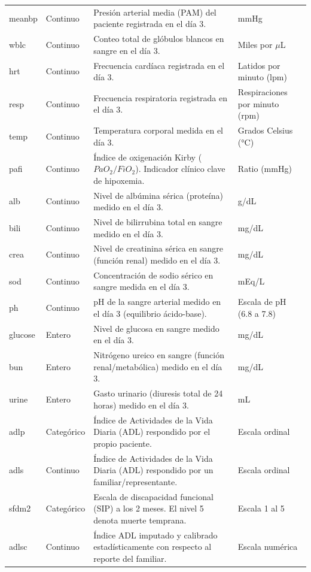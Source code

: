 \begin{longtable}{>{\raggedright\arraybackslash}p{2.1cm}>{\raggedright\arraybackslash}p{1.8cm}>{\raggedright\arraybackslash}p{7.0cm}>{\raggedright\arraybackslash}p{3.2cm}}
meanbp & Continuo & Presión arterial media (PAM) del paciente registrada en el día 3. & mmHg \\
wblc & Continuo & Conteo total de glóbulos blancos en sangre en el día 3. & Miles por $\mu$L \\
hrt & Continuo & Frecuencia cardíaca registrada en el día 3. & Latidos por minuto (lpm) \\
resp & Continuo & Frecuencia respiratoria registrada en el día 3. & Respiraciones por minuto (rpm) \\
temp & Continuo & Temperatura corporal medida en el día 3. & Grados Celsius (°C) \\
pafi & Continuo & Índice de oxigenación Kirby ($PaO_2/FiO_2$). Indicador clínico clave de hipoxemia. & Ratio (mmHg) \\
alb & Continuo & Nivel de albúmina sérica (proteína) medido en el día 3. & g/dL \\
bili & Continuo & Nivel de bilirrubina total en sangre medido en el día 3. & mg/dL \\
crea & Continuo & Nivel de creatinina sérica en sangre (función renal) medido en el día 3. & mg/dL \\
sod & Continuo & Concentración de sodio sérico en sangre medida en el día 3. & mEq/L \\
ph & Continuo & pH de la sangre arterial medido en el día 3 (equilibrio ácido-base). & Escala de pH (6.8 a 7.8) \\
glucose & Entero & Nivel de glucosa en sangre medido en el día 3. & mg/dL \\
bun & Entero & Nitrógeno ureico en sangre (función renal/metabólica) medido en el día 3. & mg/dL \\
urine & Entero & Gasto urinario (diuresis total de 24 horas) medido en el día 3. & mL \\
adlp & Categórico & Índice de Actividades de la Vida Diaria (ADL) respondido por el propio paciente. & Escala ordinal \\
adls & Continuo & Índice de Actividades de la Vida Diaria (ADL) respondido por un familiar/representante. & Escala ordinal \\
sfdm2 & Categórico & Escala de discapacidad funcional (SIP) a los 2 meses. El nivel 5 denota muerte temprana. & Escala 1 al 5 \\
adlsc & Continuo & Índice ADL imputado y calibrado estadísticamente con respecto al reporte del familiar. & Escala numérica \\
\bottomrule
\end{longtable}
\endgroup
